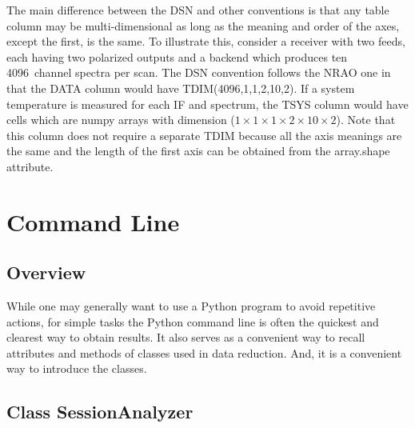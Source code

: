 \documentclass[letterpaper,11pt]{book}
\begin{document}
The main difference between the DSN and other conventions is that any table 
column may be multi-dimensional as long as the meaning and order of the axes,
except the first, is the same.  To illustrate this, consider a receiver with
two feeds, each having two polarized outputs and a backend which produces ten
4096~channel spectra per scan.  The DSN convention follows the NRAO one in that
the DATA column would have {\ttfamily TDIM(4096,1,1,2,10,2)}.  If a system 
temperature is measured for each IF and spectrum, the {\ttfamily TSYS} column 
would have cells which are numpy arrays with dimension 
($1 \times 1 \times 1 \times 2 \times 10 \times 2$). Note that this column does 
not require a separate {\ttfamily TDIM} because all the axis
meanings are the same and the length of the first axis can be obtained from
the {\ttfamily array.shape} attribute.

\chapter{Command Line}\label{chap:cmd-line}

\section{Overview}

While one may generally want to use a Python program to avoid repetitive actions,
for simple tasks the Python command line is often the quickest and clearest way
to obtain results.  It also serves as a convenient way to recall attributes
and methods of classes used in data reduction. And, it is a convenient way to
introduce the classes.

\section{Class {\ttfamily SessionAnalyzer}}
\end{document}
